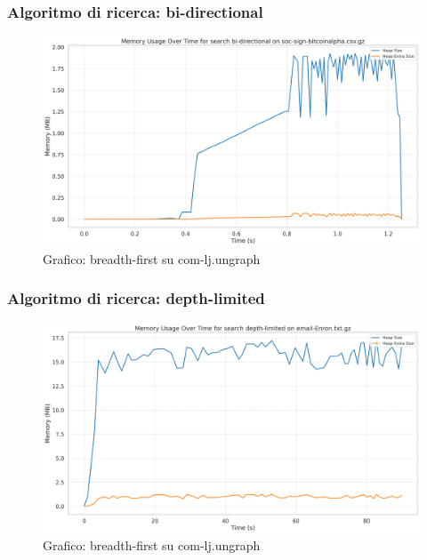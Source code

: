 \documentclass{article}
\begin{document}
\subsubsection{Algoritmo di ricerca: bi-directional}
\begin{figure}[h]\centering
\includegraphics[width=\textwidth]{../plots/soc-sign-bitcoinalpha.csv_bi-directional.png}
\caption{Grafico: breadth-first su com-lj.ungraph}
\end{figure}
\subsubsection{Algoritmo di ricerca: depth-limited}
\begin{figure}[h]\centering
\includegraphics[width=\textwidth]{../plots/email-Enron_depth-limited.png}
\caption{Grafico: breadth-first su com-lj.ungraph}
\end{figure}
\end{document}
